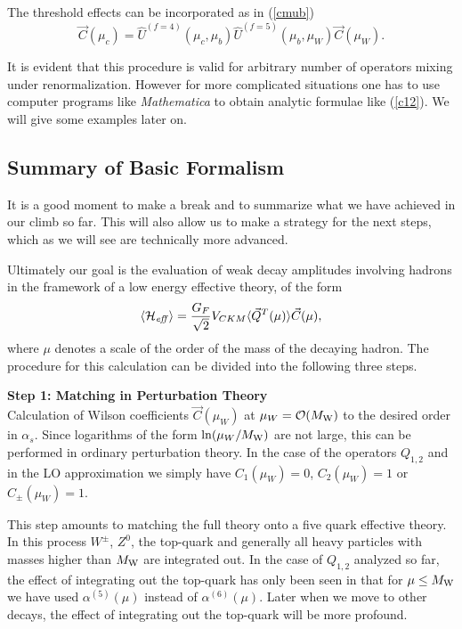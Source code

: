 \documentclass[12pt]{article}
\def\as{\alpha_s}
\newcommand{\mw}{M_{\rm W}}
\newcommand{\ord}{{\cal O}}
\begin{document}
\begin{itemize}
\begin{itemize}
\begin{itemize}
The threshold effects can be incorporated as in (\ref{cmub})
\begin{equation}\label{cmub1}
 \vec C(\mu_c)=\hat U^{(f=4)}(\mu_c,\mu_b)\hat U^{(f=5)}(\mu_b, \mu_W) 
\vec C(\mu_W).
\end{equation}

It is evident that this procedure is valid for arbitrary number
of operators mixing under renormalization. However for more
complicated situations one has to use computer programs like 
{\it Mathematica}
to obtain analytic formulae like (\ref{c12}). We will give
some examples later on.

\subsection{Summary of Basic Formalism }
            \label{sec:basicform:summary}
It is a good moment to make a break and to summarize what we have
achieved in our climb so far. This will also allow us to make
a strategy for the next steps, which as we will see are technically
more advanced.

Ultimately our goal is the evaluation of weak decay amplitudes
involving hadrons in the framework of a low energy effective theory,
of the form
\begin{displaymath}
\langle {\cal H}_{\it eff}\rangle={G_F\over\sqrt{2}}V_{CKM}
\langle \vec Q^T(\mu)\rangle \vec C(\mu),
\end{displaymath}
where $\mu$ denotes a scale of the order of the mass of the decaying
hadron.
The procedure for this calculation can be divided into the
following three steps.

\noindent
{\bf Step 1: Matching in Perturbation Theory}
\\
Calculation of Wilson coefficients $\vec C(\mu_W)$ at
$\mu_W=\ord(\mw)$ to the desired order in $\as$.  
Since
logarithms of the form $\ln(\mu_W/\mw)$ are not large, this can be
performed in ordinary perturbation theory. 
In the case
of the operators $Q_{1,2}$ and in the LO approximation we
simply have $C_1(\mu_W)=0$, $C_2(\mu_W)=1$ or $C_\pm(\mu_W)=1$.

This step
amounts to matching
the full theory onto a five quark effective theory.
In this process $W^\pm$, $Z^0$, the top-quark and generally
all heavy particles with masses higher than $\mw$ are integrated
out. In the case of $Q_{1,2}$ analyzed so far, the effect of 
integrating out the top-quark has only been seen in that for
$\mu\le\mw$ we have used $\alpha^{(5)}(\mu)$ instead of
 $\alpha^{(6)}(\mu)$. Later when we move to other decays,
the effect of integrating out the top-quark will be more profound.


\end{itemize}
\end{itemize}
\end{itemize}
\end{document}
